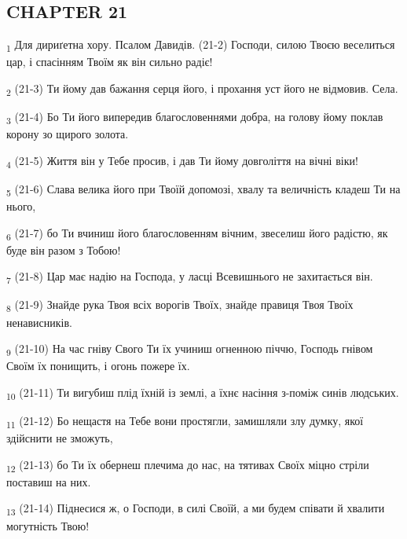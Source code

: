 \subsection{CHAPTER 21}
\begin{tcolorbox}
\textsubscript{1} Для дириґетна хору. Псалом Давидів. (21-2) Господи, силою Твоєю веселиться цар, і спасінням Твоїм як він сильно радіє!
\end{tcolorbox}
\begin{tcolorbox}
\textsubscript{2} (21-3) Ти йому дав бажання серця його, і прохання уст його не відмовив. Села.
\end{tcolorbox}
\begin{tcolorbox}
\textsubscript{3} (21-4) Бо Ти його випередив благословеннями добра, на голову йому поклав корону зо щирого золота.
\end{tcolorbox}
\begin{tcolorbox}
\textsubscript{4} (21-5) Життя він у Тебе просив, і дав Ти йому довголіття на вічні віки!
\end{tcolorbox}
\begin{tcolorbox}
\textsubscript{5} (21-6) Слава велика його при Твоїй допомозі, хвалу та величність кладеш Ти на нього,
\end{tcolorbox}
\begin{tcolorbox}
\textsubscript{6} (21-7) бо Ти вчиниш його благословенням вічним, звеселиш його радістю, як буде він разом з Тобою!
\end{tcolorbox}
\begin{tcolorbox}
\textsubscript{7} (21-8) Цар має надію на Господа, у ласці Всевишнього не захитається він.
\end{tcolorbox}
\begin{tcolorbox}
\textsubscript{8} (21-9) Знайде рука Твоя всіх ворогів Твоїх, знайде правиця Твоя Твоїх ненависників.
\end{tcolorbox}
\begin{tcolorbox}
\textsubscript{9} (21-10) На час гніву Свого Ти їх учиниш огненною піччю, Господь гнівом Своїм їх понищить, і огонь пожере їх.
\end{tcolorbox}
\begin{tcolorbox}
\textsubscript{10} (21-11) Ти вигубиш плід їхній із землі, а їхнє насіння з-поміж синів людських.
\end{tcolorbox}
\begin{tcolorbox}
\textsubscript{11} (21-12) Бо нещастя на Тебе вони простягли, замишляли злу думку, якої здійснити не зможуть,
\end{tcolorbox}
\begin{tcolorbox}
\textsubscript{12} (21-13) бо Ти їх обернеш плечима до нас, на тятивах Своїх міцно стріли поставиш на них.
\end{tcolorbox}
\begin{tcolorbox}
\textsubscript{13} (21-14) Піднесися ж, о Господи, в силі Своїй, а ми будем співати й хвалити могутність Твою!
\end{tcolorbox}
